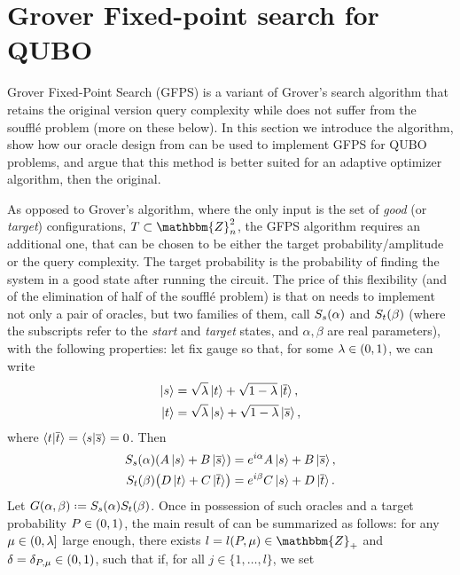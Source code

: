 \documentclass[reqno,10pt]{amsart}
\numberwithin{equation}{section}                %
\let\originalleft\left
\let\originalright\right
\renewcommand{\left}{\mathopen{}\mathclose\bgroup\originalleft}
\renewcommand{\right}{\aftergroup\egroup\originalright}
\def\({\mathopen{}\left(}
\def\){\right)\mathclose{}}
\newcommand*{\eqdef}{\mathrel{\vcenter{\baselineskip0.5ex \lineskiplimit0pt\hbox{.}\hbox{.}}}=}
\def\Z{\mathbbm{Z}}
\begin{document}
\section{Grover Fixed-point search for QUBO}
\label{sec:grover_for_qubo}

Grover Fixed-Point Search (GFPS) \cite{yoder_fixed_2014} is a variant of Grover's search algorithm that retains the original version query complexity while does not suffer from the souffl\'e problem (more on these below). In this section we introduce the algorithm, show how our oracle design from  can be used to implement GFPS for QUBO problems, and argue that this method is better suited for an adaptive optimizer algorithm, then the original.

\smallskip

As opposed to Grover's algorithm, where the only input is the set of \emph{good} (or \emph{target}) configurations, $T \subset \Z_n^2$, the GFPS algorithm requires an additional one, that can be chosen to be either the target probability/amplitude or the query complexity. The target probability is the probability of finding the system in a good state after running the circuit. The price of this flexibility (and of the elimination of half of the souffl\'e problem) is that on needs to implement not only a pair of oracles, but two families of them, call $S_s \( \alpha \)$ and $S_t \( \beta \)$ (where the subscripts refer to the \emph{start} and \emph{target} states, and $\alpha, \beta$ are real parameters), with the following properties: let fix gauge so that, for some $\lambda \in \( 0, 1 \)$, we can write
\begin{align}
   \ket{s}  &= \sqrt{\lambda} \ket{t} + \sqrt{1 - \lambda} \ket{\overline{t}}, \\
   \ket{t}  &= \sqrt{\lambda} \ket{s} + \sqrt{1 - \lambda} \ket{\overline{s}},
\end{align}
where $\braket{t | \overline{t}} = \braket{s | \overline{s}} = 0$. Then
\begin{align}
   S_s \( \alpha \) \( A \ket{s} + B \ket{\overline{s}} \)  &= e^{i \alpha} A \ket{s} + B \ket{\overline{s}}, \\
   S_t \( \beta \) \( D \ket{t} + C \ket{\overline{t}} \)   &= e^{i \beta} C \ket{s} + D \ket{\overline{t}}.
\end{align}
Let $G \( \alpha, \beta \) \eqdef S_s \( \alpha \) S_t \( \beta \)$. Once in possession of such oracles and a target probability $P \in \( 0, 1 \)$, the main result of \cite{yoder_fixed_2014} can be summarized as follows: for any $\mu \in \( 0, \lambda \right]$ large enough, there exists $l = l \( P, \mu \) \in \Z_+$ and $\delta = \delta_{P, \mu} \in \( 0, 1 \)$, such that if, for all $j \in \{ 1, \ldots, l \}$, we set
\end{document}
